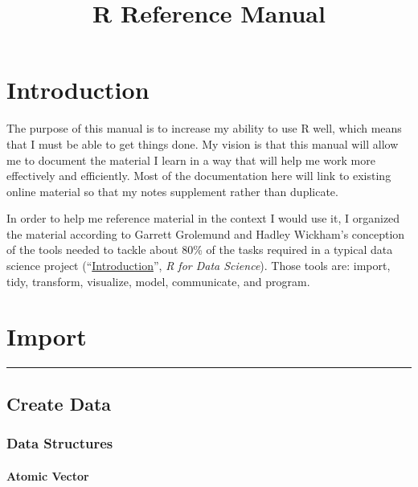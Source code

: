 \documentclass[]{book}
\title{R Reference Manual}
\author{}
\date{}
\theoremstyle{definition}
\theoremstyle{definition}
\theoremstyle{definition}
\theoremstyle{remark}
\begin{document}
\maketitle

{
\setcounter{tocdepth}{1}
\tableofcontents
}
\chapter{Introduction}\label{introduction}

The purpose of this manual is to increase my ability to use R well,
which means that I must be able to get things done. My vision is that
this manual will allow me to document the material I learn in a way that
will help me work more effectively and efficiently. Most of the
documentation here will link to existing online material so that my
notes supplement rather than duplicate.

In order to help me reference material in the context I would use it, I
organized the material according to Garrett Grolemund and Hadley
Wickham's conception of the tools needed to tackle about 80\% of the
tasks required in a typical data science project
(``\href{https://r4ds.had.co.nz/introduction.html}{Introduction}'',
\emph{R for Data Science}). Those tools are: import, tidy, transform,
visualize, model, communicate, and program.

\hypertarget{htmlwidget-d25383c2133a96d5c930}{}

\chapter{Import}\label{import}

\begin{center}\rule{0.5\linewidth}{\linethickness}\end{center}

\section{Create Data}\label{create-data}

\subsection{Data Structures}\label{data-structures}

\subsubsection{Atomic Vector}\label{atomic-vector}
\end{document}
